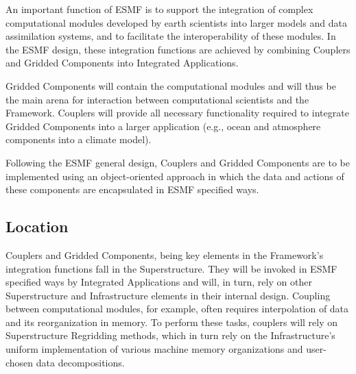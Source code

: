 




An important function of ESMF is to support the integration of
complex computational modules developed by earth scientists into
larger models and data assimilation systems, and to facilitate
the interoperability of these modules. 
In the ESMF design, these integration functions 
are achieved by combining Couplers
and Gridded Components into Integrated Applications.

Gridded Components will contain the 
computational modules and will thus be the main arena for interaction
between computational scientists and the Framework.  Couplers will
provide all necessary functionality required to integrate Gridded Components
into a larger application (e.g., ocean and atmosphere components into
a climate model).

Following the ESMF general design, Couplers and Gridded Components
are to be implemented using an object-oriented approach  
in which the data and actions of these components are encapsulated in 
ESMF specified ways.

\subsection{Location}

Couplers and Gridded Components, being key elements in the
Framework's integration functions fall in the Superstructure.
They will be invoked in ESMF specified ways by Integrated Applications 
and will, in turn, rely on other Superstructure and Infrastructure
elements in their internal design.  Coupling between computational
modules, for example, often requires interpolation of data and
its reorganization in memory. To perform these tasks, couplers will
rely on Superstructure Regridding methods, which in turn rely on the 
Infrastructure's uniform  implementation of various machine memory
organizations and user-chosen data decompositions.




